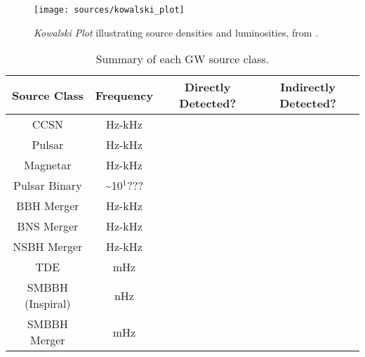 \begin{figure}[!ht]
	\centering \texttt{[image: sources/kowalski\_plot]}
	\caption{\emph{Kowalski Plot} illustrating source densities and luminosities, from \cite{ic_gen2_20}.}
	\label{fig:kowalski_plot}
\end{figure}

\begin{table*}[]
	\centering
	\begin{tabular}{| c c c c |} 
		\hline
		Source Class & Frequency & Directly Detected? & Indirectly Detected? \\ 
		\hline
		CCSN &Hz-kHz&\xmark&\xmark\\
		Pulsar &Hz-kHz &\xmark&\xmark\\
		Magnetar & Hz-kHz &\xmark&\xmark\\
		Pulsar Binary &\sim10$^{1}$???&\xmark&\textcolor{ForestGreen}{\cmark}\\
		BBH Merger &Hz-kHz&\textcolor{ForestGreen}{\cmark}&\xmark\\
		BNS Merger &Hz-kHz&\textcolor{ForestGreen}{\cmark}&\xmark\\
		NSBH Merger &Hz-kHz&\textcolor{ForestGreen}{\cmark}&\xmark\\
		TDE&mHz&\xmark&\xmark\\
		SMBBH (Inspiral) & nHz &\xmark&\xmark\\
		SMBBH Merger & mHz &\xmark&\xmark\\
		\hline
	\end{tabular}
	\caption{Summary of each GW source class.}
	\label{tab:gw_source_table}
\end{table*}{}